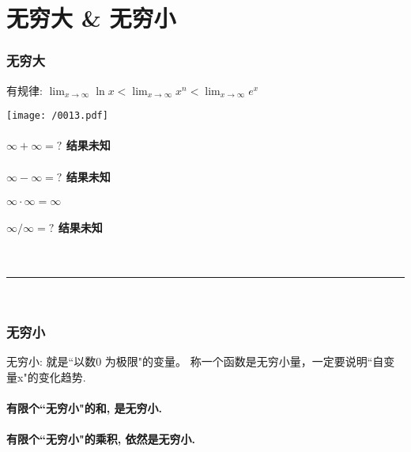 \documentclass[UTF8]{ctexart}
\begin{document}
\part{无穷大 \& 无穷小}

\section{无穷大}


有规律: $ \lim_{x \to \infty} \ln x < \lim_{x \to \infty}  x^n < \lim_{x \to \infty} e^x $

\texttt{[image: /0013.pdf]}


\subsection{$ \infty + \infty = ? $ 结果未知 } 

\subsection{$ \infty - \infty = ? $ 结果未知 } 

\subsection{$ \infty \cdot \infty = \infty $  } 

\subsection{$ \infty / \infty = ? $ 结果未知 } 



~\\
\hrule
~\\

\section{无穷小}

无穷小: 就是``以数0 为极限"的变量。 称一个函数是无穷小量，一定要说明``自变量x"的变化趋势.

\subsection{有限个``无穷小"的和, 是无穷小. } 

\subsection{有限个``无穷小"的乘积, 依然是无穷小. } 
\end{document}
